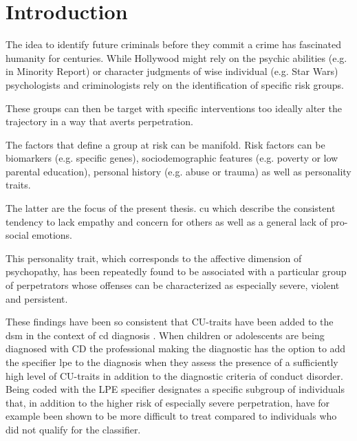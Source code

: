 
\section{Introduction}

The idea to identify future criminals before they commit a crime has fascinated humanity for centuries.
While Hollywood might rely on the psychic abilities (e.g. in Minority Report) or character judgments of wise individual (e.g. Star Wars) psychologists and criminologists rely on the identification of specific risk groups.

These groups can then be target with specific interventions too ideally alter the trajectory in a way that averts perpetration.

The factors that define a group at risk can be manifold.
Risk factors can be biomarkers (e.g. specific genes), sociodemographic features (e.g. poverty or low parental education), personal history
(e.g. abuse or trauma) as well as personality traits.

The latter are the focus of the present thesis. \gls{cu} which describe the consistent tendency to lack empathy and concern for others as well as a general lack of pro-social emotions.

This personality trait, which corresponds to the affective dimension of psychopathy, has been repeatedly found to be associated with a 
particular group of perpetrators whose offenses can be characterized as especially severe, violent and persistent.

These findings have been so consistent that CU-traits have been added to the \gls{dsm} in the context of \gls{cd} diagnosis \parencite{DSM-5}.
When children or adolescents are being diagnosed with CD the professional making the diagnostic has the option to add the specifier
\gls{lpe} to the diagnosis when they assess the presence of a sufficiently high level of CU-traits in addition to the diagnostic criteria
of conduct disorder.
Being coded with the LPE specifier designates a specific subgroup of individuals that, in addition to the higher risk of especially severe perpetration,  have for example been shown to be more difficult to treat \parencite{hawes_callous-unemotional_2014} compared to individuals who did not qualify for the classifier.

